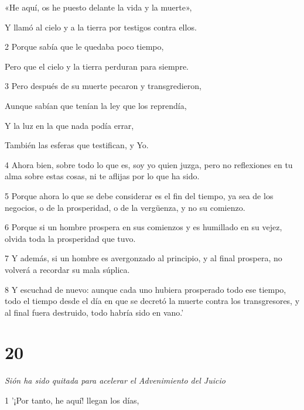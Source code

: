 \par «He aquí, os he puesto delante la vida y la muerte»,

Y llamó al cielo y a la tierra por testigos contra ellos.

\par 2 Porque sabía que le quedaba poco tiempo,

\par Pero que el cielo y la tierra perduran para siempre.

\par 3 Pero después de su muerte pecaron y transgredieron,

\par Aunque sabían que tenían la ley que los reprendía,

\par Y la luz en la que nada podía errar,

\par También las esferas que testifican, y Yo.

\par 4 Ahora bien, sobre todo lo que es, soy yo quien juzga, pero no reflexiones en tu alma sobre estas cosas, ni te aflijas por lo que ha sido.

\par 5 Porque ahora lo que se debe considerar es el fin del tiempo, ya sea de los negocios, o de la prosperidad, o de la vergüenza, y no su comienzo.

\par 6 Porque si un hombre prospera en sus comienzos y es humillado en su vejez, olvida toda la prosperidad que tuvo.

\par 7 Y además, si un hombre es avergonzado al principio, y al final prospera, no volverá a recordar su mala súplica.

\par 8 Y escuchad de nuevo: aunque cada uno hubiera prosperado todo ese tiempo, todo el tiempo desde el día en que se decretó la muerte contra los transgresores, y al final fuera destruido, todo habría sido en vano.'

\chapter{20}

\par \textit{Sión ha sido quitada para acelerar el Advenimiento del Juicio}

\par 1 '¡Por tanto, he aquí! llegan los días,

